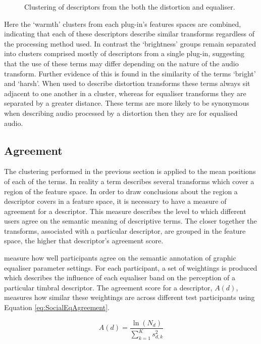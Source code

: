\begin{figure}[h!]
{					\label{fig:CombinedDifferenceClusters}
				}
				\caption{Clustering of descriptors from the both the distortion and equaliser.}
				\label{fig:CombinedClusters}
			\end{figure}

			Here the `warmth' clusters from each plug-in's features spaces are combined, indicating that each
			of these descriptors describe similar transforms regardless of the processing method used. In
			contrast the `brightness' groups remain separated into clusters comprised mostly of descriptors
			from a single plug-in, suggesting that the use of these terms may differ depending on the nature of
			the audio transform.  Further evidence of this is found in the similarity of the terms `bright' and
			`harsh'.  When used to describe distortion transforms these terms always sit adjacent to one
			another in a cluster, whereas for equaliser transforms they are separated by a greater distance.
			These terms are more likely to be synonymous when describing audio processed by a distortion then
			they are for equalised audio. 

	\subsection{Agreement}
	\label{sec:TimbreEvaluation-Analysis-Agreement}
		The clustering performed in the previous section is applied to the mean positions of each of the terms. In
		reality a term describes several transforms which cover a region of the feature space. In order to draw
		conclusions about the region a descriptor covers in a feature space, it is necessary to have a measure of
		agreement for a descriptor. This measure describes the level to which different users agree on the semantic
		meaning of descriptive terms. The closer together the transforms, associated with a particular descriptor,
		are grouped in the feature space, the higher that descriptor's agreement score.

		\citet{cartwright2013socialeq} measure how well participants agree on the semantic annotation of graphic
		equaliser parameter settings. For each participant, a set of weightings is produced which describes the
		influence of each equaliser band on the perception of a particular timbral descriptor. The agreement score
		for a descriptor, $A(d)$, measures how similar these weightings are across different test participants
		using Equation \ref{eq:SocialEqAgreement}.

		\begin{equation}
			A(d) = \frac{\ln(N_{d})}{\sum_{k = 1}^{K} s_{d,k}^{2}}
			\label{eq:SocialEqAgreement}
		\end{equation}

